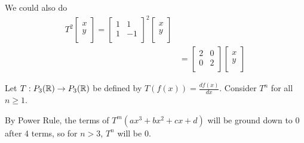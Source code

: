 \documentclass{article}
\begin{document}
\begin{example}
  We could also do
  \begin{align*}
    T^2
    \begin{bmatrix}
      x\\y\\
    \end{bmatrix} =
    \begin{bmatrix}
      1 & 1\\
      1 & -1\\
    \end{bmatrix}^2
    \begin{bmatrix}
      x\\y\\
    \end{bmatrix}\\
    &=
    \begin{bmatrix}
      2 & 0\\
      0 & 2\\
    \end{bmatrix}
    \begin{bmatrix}
      x\\y\\
    \end{bmatrix}
  \end{align*}
\end{example}
\begin{example}
  Let $T: P_3(\mathbb{R}) \to P_3(\mathbb{R})$ be defined by $T(f(x)) = \frac{df(x)}{dx}$. Consider $T^n$ for all $n \geq 1$.

  By Power Rule, the terms of $T^m(ax^3 + bx^2 + cx + d)$ will be ground down to $0$ after 4 terms, so for $n > 3$, $T^n$ will be 0.
\end{example}
\end{document}
